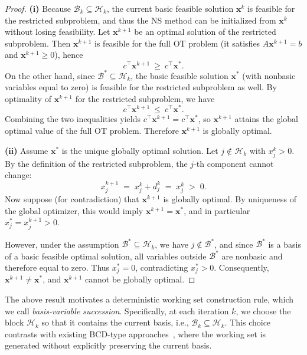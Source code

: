 \documentclass[12pt,a4paper]{article}
\begin{document}
\begin{proof}
\medskip
\noindent\textbf{(i)}
Because \(\mathcal B_k\subseteq \mathcal H_k\), the current basic feasible solution
\(\mathbf{x}^k\) is feasible for the restricted subproblem, and thus the NS method can be
initialized from \(\mathbf{x}^k\) without losing feasibility.
Let \(\mathbf{x}^{k+1}\) be an optimal solution of the restricted subproblem.
Then \(\mathbf{x}^{k+1}\) is feasible for the full OT problem (it satisfies \(A\mathbf{x}^{k+1}=b\) and
\(\mathbf{x}^{k+1}\ge 0\)), hence
\[
c^\top \mathbf{x}^{k+1}\ \ge\ c^\top \mathbf{x}^\ast.
\]
On the other hand, since \(\mathcal B^\ast\subseteq \mathcal H_k\), the basic feasible solution
\(\mathbf{x}^\ast\) (with nonbasic variables equal to zero) is feasible for the restricted subproblem as well.
By optimality of \(\mathbf{x}^{k+1}\) for the restricted subproblem, we have
\[
c^\top \mathbf{x}^{k+1}\ \le\ c^\top \mathbf{x}^\ast.
\]
Combining the two inequalities yields \(c^\top \mathbf{x}^{k+1}=c^\top \mathbf{x}^\ast\), so
\(\mathbf{x}^{k+1}\) attains the global optimal value of the full OT problem. Therefore
\(\mathbf{x}^{k+1}\) is globally optimal.

\medskip
\noindent\textbf{(ii)}
Assume \(\mathbf{x}^\ast\) is the unique globally optimal solution.
Let \(j\notin \mathcal H_k\) with \(x^k_j>0\). By the definition of the restricted subproblem, the \(j\)-th component cannot change:
\[
x^{k+1}_j \;=\; x^k_j + d^k_j \;=\; x^k_j \;>\; 0.
\]
Now suppose (for contradiction) that \(\mathbf{x}^{k+1}\) is globally optimal.
By uniqueness of the global optimizer, this would imply \(\mathbf{x}^{k+1}=\mathbf{x}^\ast\),
and in particular \(x^\ast_j=x^{k+1}_j>0\).

However, under the assumption \(\mathcal B^\ast\subseteq \mathcal H_k\), we have \(j\notin \mathcal B^\ast\),
and since \(\mathcal B^\ast\) is a basis of a basic feasible optimal solution, all variables outside
\(\mathcal B^\ast\) are nonbasic and therefore equal to zero. Thus \(x^\ast_j=0\), contradicting
\(x^\ast_j>0\). Consequently, \(\mathbf{x}^{k+1}\neq \mathbf{x}^\ast\), and \(\mathbf{x}^{k+1}\) cannot be globally optimal.
\end{proof}




The above result motivates a deterministic working set construction rule, which we call
\emph{basis-variable succession}. Specifically, at each iteration $k$, we choose the block
$\mathcal{H}_k$ so that it contains the current basis, i.e., $\mathcal{B}_k \subseteq \mathcal{H}_k$.
This choice contrasts with existing BCD-type approaches~\cite{xie2023randomized}, where the
working set is generated without explicitly preserving the current basis.
\end{document}
